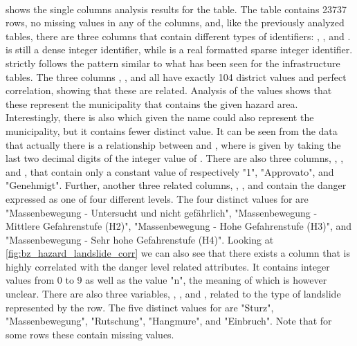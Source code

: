 \paragraph{}
 shows the single columns analysis results for the  table. The table contains 23737 rows, no missing values in any of the columns, and, like the previously analyzed tables, there are three columns that contain different types of identifiers: , , and .  is still a dense integer identifier, while  is a real formatted sparse integer identifier.  strictly follows the pattern  similar to what has been seen for the infrastructure tables.
The three columns , , and  all have exactly 104 district values and perfect correlation, showing that these are related. Analysis of the values shows that these represent the municipality that contains the given hazard area. Interestingly, there is also  which given the name could also represent the municipality, but it contains fewer distinct value. It can be seen from the data that actually there is a relationship between  and , where  is given by taking the last two decimal digits of the integer value of .
There are also three columns, , , and , that contain only a constant value of respectively "1", "Approvato", and "Genehmigt".
Further, another three related columns, , , and  contain the danger expressed as one of four different levels. The four distinct values for  are "Massenbewegung - Untersucht und nicht gefährlich", "Massenbewegung - Mittlere Gefahrenstufe (H2)", "Massenbewegung - Hohe Gefahrenstufe (H3)", and "Massenbewegung - Sehr hohe Gefahrenstufe (H4)". Looking at \cref{fig:bz_hazard_landslide_corr} we can also see that there exists a column  that is highly correlated with the danger level related attributes. It contains integer values from 0 to 9 as well as the value "n", the meaning of which is however unclear.
There are also three variables, , , and , related to the type of landslide represented by the row. The five distinct values for  are "Sturz", "Massenbewegung", "Rutschung", "Hangmure", and "Einbruch". Note that for some rows these contain missing values.
